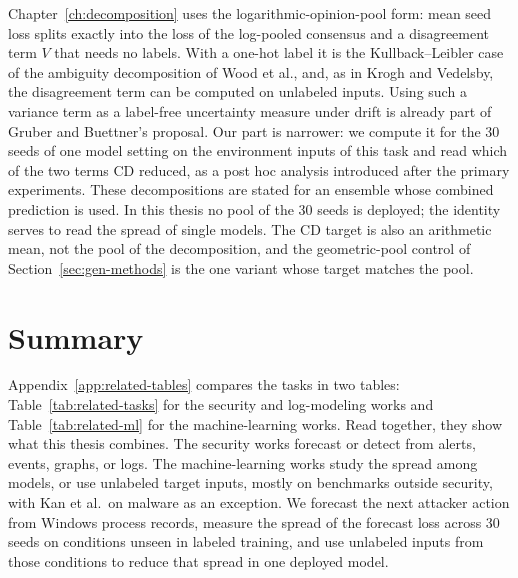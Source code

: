 Chapter~\ref{ch:decomposition} uses the logarithmic-opinion-pool form:
mean seed loss splits exactly into the loss of the log-pooled consensus
and a disagreement term $V$ that needs no labels. With a one-hot label
it is the Kullback--Leibler case of the ambiguity decomposition of
Wood et al., and, as in Krogh and Vedelsby, the disagreement term can
be computed on unlabeled inputs.
Using such a variance
term as a label-free uncertainty measure under drift is already part
of Gruber and Buettner's proposal. Our part is narrower: we compute it
for the 30 seeds of one model setting on the environment inputs of this
task and read which of the two terms CD reduced, as a post hoc analysis
introduced after the primary experiments.
These decompositions are stated for an ensemble whose combined
prediction is used. In this thesis no pool of the 30 seeds is
deployed; the identity serves to read the spread of single models.
The CD target is also an arithmetic mean, not the pool of the
decomposition, and the geometric-pool control of
Section~\ref{sec:gen-methods} is the one variant whose target matches
the pool.

\section{Summary}
\label{sec:related-summary}

Appendix~\ref{app:related-tables} compares the tasks in two tables:
Table~\ref{tab:related-tasks} for the security and log-modeling works
and Table~\ref{tab:related-ml} for the machine-learning works. Read
together, they show what this thesis combines. The security
works forecast or detect from alerts, events, graphs, or logs. The machine-learning works
study the spread among models, or use unlabeled target inputs, mostly
on benchmarks outside security, with Kan et al.\ on malware as an
exception. We forecast the next attacker action from Windows process
records, measure the spread of the forecast loss across 30 seeds on
conditions unseen in labeled training, and use unlabeled inputs from
those conditions to reduce that spread in one deployed model.
